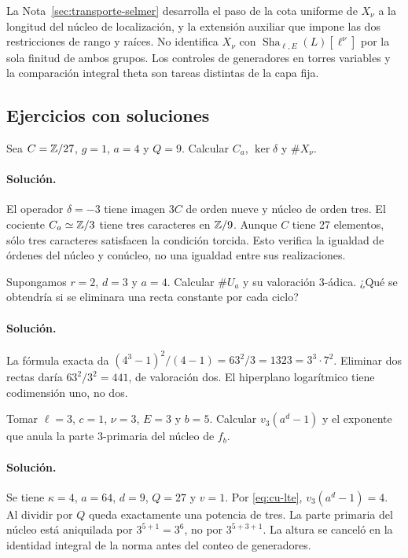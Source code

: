 La Nota~\ref{sec:transporte-selmer} desarrolla el paso de la cota uniforme de $X_\nu$ a la longitud del núcleo de localización, y la extensión auxiliar que impone las dos restricciones de rango y raíces. No identifica $X_\nu$ con $\operatorname{Sha}_{\ell,E}(L)[\ell^\nu]$ por la sola finitud de ambos grupos. Los controles de generadores en torres variables y la comparación integral theta son tareas distintas de la capa fija.

\subsection{Ejercicios con soluciones}

\begin{ejercicio}
Sea $C=\mathbb{Z}/27$, $g=1$, $a=4$ y $Q=9$. Calcular $C_a$, $\ker\delta$ y $\#X_\nu$.
\end{ejercicio}
\paragraph{Solución.} El operador $\delta=-3$ tiene imagen $3C$ de orden nueve y núcleo de orden tres. El cociente $C_a\simeq\mathbb{Z}/3$ tiene tres caracteres en $\mathbb{Z}/9$. Aunque $C$ tiene 27 elementos, sólo tres caracteres satisfacen la condición torcida. Esto verifica la igualdad de órdenes del núcleo y conúcleo, no una igualdad entre sus realizaciones.

\begin{ejercicio}
Supongamos $r=2$, $d=3$ y $a=4$. Calcular $\#U_a$ y su valoración $3$-ádica. ¿Qué se obtendría si se eliminara una recta constante por cada ciclo?
\end{ejercicio}
\paragraph{Solución.} La fórmula exacta da $(4^3-1)^2/(4-1)=63^2/3=1323=3^3\cdot7^2$. Eliminar dos rectas daría $63^2/3^2=441$, de valoración dos. El hiperplano logarítmico tiene codimensión uno, no dos.

\begin{ejercicio}
Tomar $\ell=3$, $c=1$, $\nu=3$, $E=3$ y $b=5$. Calcular $v_3(a^d-1)$ y el exponente que anula la parte $3$-primaria del núcleo de $f_b$.
\end{ejercicio}
\paragraph{Solución.} Se tiene $\kappa=4$, $a=64$, $d=9$, $Q=27$ y $v=1$. Por \eqref{eq:cu-lte}, $v_3(a^d-1)=4$. Al dividir por $Q$ queda exactamente una potencia de tres. La parte primaria del núcleo está aniquilada por $3^{5+1}=3^6$, no por $3^{5+3+1}$. La altura se canceló en la identidad integral de la norma antes del conteo de generadores.

